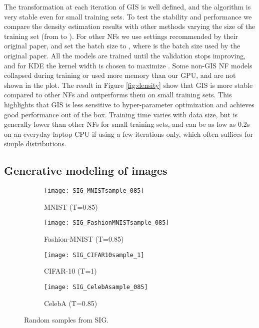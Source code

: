 \documentclass{article}
\begin{document}
The transformation at each iteration of GIS is well defined, and the algorithm is very stable even for small training sets. To test the stability and performance we compare the density estimation results with other methods 
varying the size of the training set  (from  to ). 
For other NFs we use settings recommended by their original paper, and set the batch size to , where  is the batch size used by the original paper. All the models are trained until the validation  stops improving, and for KDE the kernel width is chosen to maximize . Some non-GIS NF models collapsed during training or used more memory than our GPU, and are not shown in the plot. The result in Figure \ref{fig:density} show that GIS is more stable compared to other NFs and outperforms them on small training sets. This highlights that GIS is less sensitive to hyper-parameter optimization and achieves good performance out of the box. Training time varies with data size, but is generally lower than other NFs for small training sets, and can be as low as 0.2s on an everyday laptop CPU if using a few iterations only, which often suffices for simple distributions.

\subsection{Generative modeling of images}

\label{subsec:samples}

\begin{figure}
     \centering
     \begin{subfigure}[b]{0.495\linewidth}
         \centering
         \texttt{[image: SIG\_MNISTsample\_085]}
         \caption{MNIST (T=0.85)}
     \end{subfigure}
     \hfill
     \begin{subfigure}[b]{0.495\linewidth}
         \centering
         \texttt{[image: SIG\_FashionMNISTsample\_085]}
         \caption{Fashion-MNIST (T=0.85)}
     \end{subfigure}
     \hfill
     \begin{subfigure}[b]{0.495\linewidth}
         \centering
         \texttt{[image: SIG\_CIFAR10sample\_1]}
         \caption{CIFAR-10 (T=1)}
     \end{subfigure}
     \hfill
     \begin{subfigure}[b]{0.495\linewidth}
         \centering
         \texttt{[image: SIG\_CelebAsample\_085]}
         \caption{CelebA (T=0.85)}
     \end{subfigure}
     \caption{Random samples from SIG.}
     \label{fig:sample}
     \vskip -0.2in
\end{figure}
\end{document}
